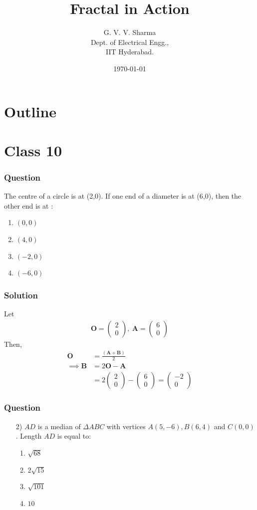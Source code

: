 \documentclass{beamer}
\title{Fractal in Action}
\author{G. V. V. Sharma \\ Dept. of Electrical Engg.,\\IIT Hyderabad.}
\date{\today}
\providecommand{\brak}[1]{\ensuremath{\left(#1\right)}}
\theoremstyle{remark}
\newcommand{\myvec}[1]{\ensuremath{\begin{pmatrix}#1\end{pmatrix}}}
\let\vec\mathbf
\begin{document}
\begin{frame}
\titlepage
\end{frame}

\section*{Outline}
\begin{frame}
\tableofcontents
\end{frame}
\section{Class 10}
\begin{frame}
\frametitle{Question}
The centre of a circle is at (2,0). If one end of a diameter is at (6,0), then the other end is at :
\begin{enumerate}
\item $\brak{0,0}$
\item $\brak{4,0}$
\item $\brak{-2,0}$
\item $\brak{-6,0}$
\end{enumerate}
\end{frame}
%
\begin{frame}
\frametitle{Solution}
Let
\begin{align}
	\vec{O} =
    \myvec{
2 \\
0 
},\
\vec{A} =
    \myvec{
6 \\
0 
}
\end{align}
Then,
\begin{align}
\vec{O} &= \frac{\brak{\vec{A} + \vec{B}}}{2}\\
\implies \vec{B} &= 2\vec{O} - \vec{A}\\
    &=  2\myvec{
2 \\
0 
} -  \myvec{
6 \\
0 
}
=\myvec{
   -2\\
   0
}
\end{align}
\end{frame}
\begin{frame}
\frametitle{Question }
\begin{enumerate}
\item [2)]
$AD$ is a median of $\Delta ABC$ with vertices $A\brak{5,-6}, B\brak{6,4}$ and $C\brak{0,0}$. Length $AD$ is equal to:
\begin{enumerate}
\item  $\sqrt{68}$
\item  $2\sqrt{15}$
\item  $\sqrt{101}$
\item  $10$
\end{enumerate}
\end{enumerate}
\end{frame}
\end{document}
